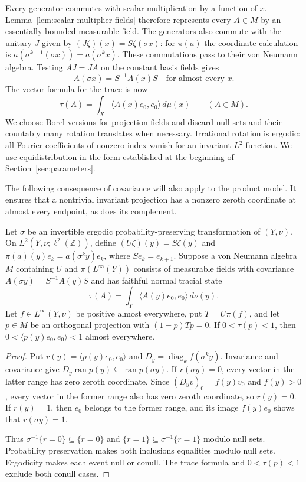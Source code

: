 Every generator commutes with scalar multiplication by a function of $x$.
Lemma~\ref{lem:scalar-multiplier-fields} therefore represents every $A\in M$
by an essentially bounded measurable field.  The generators also commute
with the unitary $J$ given by $(J\zeta)(x)=S\zeta(\sigma x)$:
for $\pi(a)$ the coordinate calculation is
$a(\sigma^{k-1}(\sigma x))=a(\sigma^kx)$.
These commutations pass to their von Neumann algebra.  Testing $AJ=JA$ on
the constant basis fields gives
\begin{equation}\label{eq:field-covariance}
 A(\sigma x)=S^{-1}A(x)S\quad\text{for almost every }x.
\end{equation}
The vector formula for the trace is now
\begin{equation}\label{eq:field-trace}
 \tau(A)=\int_X\langle A(x)e_0,e_0\rangle\,d\mu(x)
 \qquad(A\in M).
\end{equation}
We choose Borel versions for projection fields and discard null sets and
their countably many rotation translates when necessary.  Irrational
rotation is ergodic: all Fourier coefficients of nonzero index vanish
for an invariant $L^2$ function.  We use equidistribution
in the form established at the beginning of Section~\ref{sec:parameters}.

The following consequence of covariance will also apply to the product
model.  It ensures that a nontrivial invariant projection has a nonzero
zeroth coordinate at almost every endpoint, as does its complement.

\begin{lemma}\label{lem:positive-diagonal}
Let $\sigma$ be an invertible ergodic probability-preserving transformation
of $(Y,\nu)$.  On $L^2(Y,\nu;\ell^2(\mathbb Z))$, define
$(U\zeta)(y)=S\zeta(y)$ and
$\pi(a)(y)e_k=a(\sigma^ky)e_k$, where $Se_k=e_{k+1}$.
Suppose a von Neumann algebra $M$ containing $U$ and $\pi(L^\infty(Y))$
consists of measurable fields with covariance
$A(\sigma y)=S^{-1}A(y)S$ and has faithful normal tracial state
\[
 \tau(A)=\int_Y\langle A(y)e_0,e_0\rangle\,d\nu(y).
\]
Let $f\in L^\infty(Y,\nu)$ be positive almost everywhere, put $T=U\pi(f)$,
and let $p\in M$ be an orthogonal projection with $(1-p)Tp=0$.
If $0<\tau(p)<1$, then $0<\langle p(y)e_0,e_0\rangle<1$ almost everywhere.
\end{lemma}

\begin{proof}
Put $r(y)=\langle p(y)e_0,e_0\rangle$ and
$D_y=\operatorname{diag}_k f(\sigma^ky)$.
Invariance and covariance give
$D_y\operatorname{ran}p(y)\subseteq\operatorname{ran}p(\sigma y)$.
If $r(\sigma y)=0$, every vector in the latter range has zero zeroth
coordinate.  Since $(D_yv)_0=f(y)v_0$ and $f(y)>0$, every vector in the
former range also has zero zeroth coordinate, so $r(y)=0$.
If $r(y)=1$, then $e_0$ belongs to the former range, and its image
$f(y)e_0$ shows that $r(\sigma y)=1$.

Thus $\sigma^{-1}\{r=0\}\subseteq\{r=0\}$ and
$\{r=1\}\subseteq\sigma^{-1}\{r=1\}$ modulo null sets.
Probability preservation makes both inclusions equalities modulo null
sets.  Ergodicity makes each event null or conull.  The trace formula and
$0<\tau(p)<1$ exclude both conull cases.
\end{proof}

